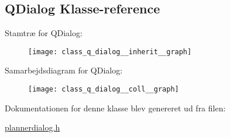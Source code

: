 \hypertarget{class_q_dialog}{}\subsection{Q\+Dialog Klasse-\/reference}
\label{class_q_dialog}


Stamtræ for Q\+Dialog\+:
\nopagebreak
\begin{figure}[H]
\begin{center}
\leavevmode
\texttt{[image: class\_q\_dialog\_\_inherit\_\_graph]}
\end{center}
\end{figure}


Samarbejdsdiagram for Q\+Dialog\+:
\nopagebreak
\begin{figure}[H]
\begin{center}
\leavevmode
\texttt{[image: class\_q\_dialog\_\_coll\_\_graph]}
\end{center}
\end{figure}


Dokumentationen for denne klasse blev genereret ud fra filen\+:\begin{DoxyCompactItemize}
\item 
\hyperlink{plannerdialog_8h}{plannerdialog.\+h}\end{DoxyCompactItemize}

